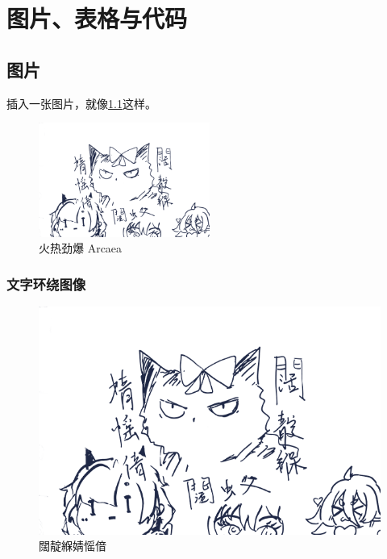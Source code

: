 \chapter{图片、表格与代码}

\section{图片}

插入一张图片，就像\cref{fig:arcaea}这样。

\begin{figure}[htbp]
    \centering
    \includegraphics[width=0.5\textwidth]{test.png}
    \caption{火热劲爆 Arcaea}
    \label{fig:arcaea}
\end{figure}
\zhlipsum[3][name=aspirin]

\subsection{文字环绕图像}
\begin{figure}
    \label{fig:arcaeaedge}
    \includegraphics[width=.15\textwidth]{test.png}
    \caption{闊靛緥婧愮偣}
\end{figure}
\zhlipsum[2][name=simp]


